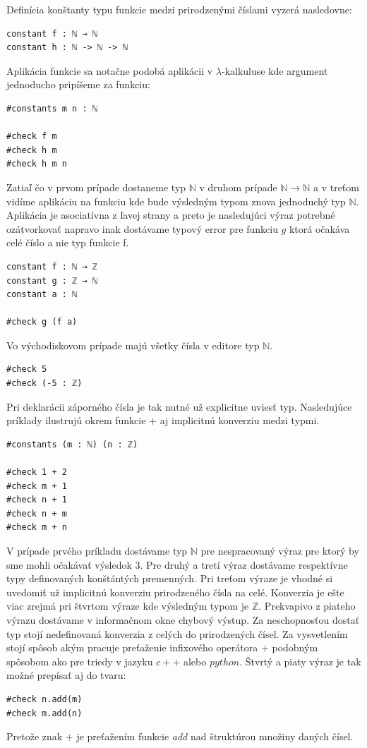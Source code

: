 \documentclass[a4paper,10pt,oneside]{report}%
\begin{document}
    Definícia konštanty typu funkcie medzi prirodzenými číslami vyzerá nasledovne:
\begin{lstlisting}
constant f : ℕ → ℕ
constant h : ℕ -> ℕ -> ℕ
\end{lstlisting}
    Aplikácia funkcie sa notačne podobá aplikácii v $\lambda$-kalkuluse kde argument
jednoducho pripíšeme za funkciu:
\begin{lstlisting}
#constants m n : ℕ

#check f m
#check h m
#check h m n
\end{lstlisting}
    Zatiaľ čo v prvom prípade dostaneme typ $\mathbb{N}$ v druhom prípade
$\mathbb{N} \to \mathbb{N}$ a v treťom vidíme aplikáciu na funkciu kde bude výsledným
typom znova jednoduchý typ $\mathbb{N}$.
    Aplikácia je asociatívna z ľavej strany a  preto je nasledujúci výraz potrebné 
ozátvorkovať napravo inak dostávame typový error pre funkciu $g$ ktorá očakáva 
celé číslo a nie typ funkcie f.
\begin{lstlisting}
constant f : ℕ → ℤ
constant g : ℤ → ℕ
constant a : ℕ

#check g (f a)
\end{lstlisting}
    Vo východiskovom prípade majú všetky čísla v editore typ $\mathbb{N}$.
\begin{lstlisting}
#check 5
#check (-5 : ℤ)
\end{lstlisting}
    Pri deklarácii záporného čísla je tak nutné už explicitne uviesť typ.
Nasledujúce príklady ilustrujú okrem funkcie $+$ aj implicitnú konverziu medzi typmi.
\begin{lstlisting}
#constants (m : ℕ) (n : ℤ)

#check 1 + 2
#check m + 1
#check n + 1
#check n + m
#check m + n
\end{lstlisting}
    V prípade prvého príkladu dostávame typ $\mathbb{N}$ pre nespracovaný výraz pre
ktorý by sme mohli očakávať výsledok $3$.
    Pre druhý a tretí výraz dostávame respektívne typy definovaných konštántých
premenných.
    Pri treťom výraze je vhodné si uvedomiť už implicitnú konverziu prirodzeného
čísla na celé.
    Konverzia je ešte viac zrejmá pri štvrtom výraze kde výsledným typom je
$\mathbb{Z}$.
    Prekvapivo z piateho výrazu dostávame v informačnom okne chybový výstup.
    Za neschopnosťou dostať typ stojí nedefinovaná konverzia z celých do prirodzených
čísel.
    Za vysvetlením stojí spôsob akým pracuje preťaženie infixového operátora $+$
podobným spôsobom ako pre triedy v jazyku $c++$ alebo $python$. Štvrtý a piaty
výraz je tak možné prepísať aj do tvaru:
\begin{lstlisting}
#check n.add(m)
#check m.add(n)
\end{lstlisting}
    Pretože znak $+$ je preťažením funkcie \emph{add} nad štruktúrou množiny daných
čísel.
\end{document}
